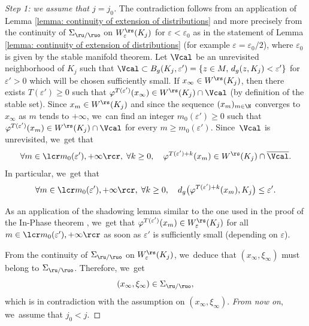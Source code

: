 \begin{proof}[Step 1: we assume that $j = j_0$]
The contradiction follows from an application of Lemma \ref{lemma: continuity of extension of distributions} and more precisely from the continuity of $\Sigma_{\ru/\ruo}$ on $W_{\varepsilon}^\rs (K_j)$ for $\varepsilon < \varepsilon_0$ as in the statement of Lemma \ref{lemma: continuity of extension of distributions} (for example $\varepsilon = \varepsilon_0/2$), where $\varepsilon_0$ is given by the stable manifold theorem. Let $\Vcal$ be an unrevisited neighborhood of $K_j$ such that $\Vcal \subset B_g (K_j, \varepsilon') = \{z \in M,\, d_g (z, K_j) < \varepsilon' \}$ for $\varepsilon' > 0$ which will be chosen sufficiently small. If $x_{\infty} \in W^\rs (K_j)$, then there exists $T(\varepsilon') \geq 0$ such that $\varphi^{T (\varepsilon')} (x_{\infty}) \in W^\rs (K_j) \cap \Vcal$ (by definition of the stable set).
Since $x_m \in W^\rs (K_j)$ and since the sequence $(x_m)_{m \in \N}$ converges to $x_{\infty}$ as $m$ tends to $+\infty$, we~can find an integer $m_0 (\varepsilon') \geq 0$ such that $\varphi^{T(\varepsilon')} (x_m) \in W^\rs (K_j) \cap \Vcal$ for every $m \geq m_0 (\varepsilon')$. Since~$\Vcal$ is unrevisited, we~get that
\[
\forall m \in \lcr m_0 (\varepsilon'), +\infty \rcr,\;\forall k \geq 0, \quad \varphi^{T(\varepsilon') + k} (x_m) \in W^\rs (K_j) \cap \overline{\Vcal}.
\]
In particular, we~get that
\[
\forall m \in \lcr m_0 (\varepsilon'), +\infty \rcr,\; \forall k \geq 0, \quad d_g \bigl(\varphi^{T(\varepsilon') + k} (x_m), K_j \bigr) \leq \varepsilon'.
\]

As an application of the shadowing lemma \cite[Th.\,5.3.3]{FH} similar to the one used in the proof of the In-Phase theorem \cite[Th.\,5.3.25]{FH}, we~get that $\varphi^{T(\varepsilon')} (x_m) \in W_{\varepsilon}^\rs (K_j)$ for all $m \in \lcr m_0 (\varepsilon'), +\infty \rcr$ as soon as $\varepsilon'$ is sufficiently small (depending on $\varepsilon$).

From the continuity of $\Sigma_{\ru/\ruo}$ on $W_{\varepsilon}^\rs (K_j)$, we~deduce that $(x_{\infty}, \xi_{\infty})$ must belong to $\Sigma_{\ru/\ruo}$. Therefore, we~get
\[
(x_{\infty}, \xi_{\infty}) \in \Sigma_{\ru/\ruo},
\]
which is in contradiction with the assumption on $(x_{\infty}, \xi_{\infty})$. \emph{From now on}, we~assume that
$j_0 < j$.


\end{proof}
